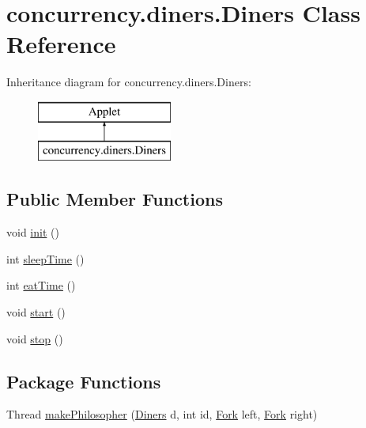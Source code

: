 \hypertarget{classconcurrency_1_1diners_1_1_diners}{}\section{concurrency.\+diners.\+Diners Class Reference}
\label{classconcurrency_1_1diners_1_1_diners}
Inheritance diagram for concurrency.\+diners.\+Diners\+:\begin{figure}[H]
\begin{center}
\leavevmode
\includegraphics[height=2.000000cm]{classconcurrency_1_1diners_1_1_diners}
\end{center}
\end{figure}
\subsection*{Public Member Functions}
\begin{DoxyCompactItemize}
\item 
void \mbox{\hyperlink{classconcurrency_1_1diners_1_1_diners_a8fa1aaa0013516431481bc274e86717a}{init}} ()
\item 
int \mbox{\hyperlink{classconcurrency_1_1diners_1_1_diners_afda5c09982e95dad9d35038d370f0526}{sleep\+Time}} ()
\item 
int \mbox{\hyperlink{classconcurrency_1_1diners_1_1_diners_aa9a143c6257dd6e5c179fc47d53753c6}{eat\+Time}} ()
\item 
void \mbox{\hyperlink{classconcurrency_1_1diners_1_1_diners_a125c1910ae8e2052ba0c77e27e7cc6d3}{start}} ()
\item 
void \mbox{\hyperlink{classconcurrency_1_1diners_1_1_diners_a8220eee7d0a03b9d21b3a2501b6abed8}{stop}} ()
\end{DoxyCompactItemize}
\subsection*{Package Functions}
\begin{DoxyCompactItemize}
\item 
Thread \mbox{\hyperlink{classconcurrency_1_1diners_1_1_diners_a2576319d2ab7d71417cccc214fab518d}{make\+Philosopher}} (\mbox{\hyperlink{classconcurrency_1_1diners_1_1_diners}{Diners}} d, int id, \mbox{\hyperlink{classconcurrency_1_1diners_1_1_fork}{Fork}} left, \mbox{\hyperlink{classconcurrency_1_1diners_1_1_fork}{Fork}} right)
\end{DoxyCompactItemize}
